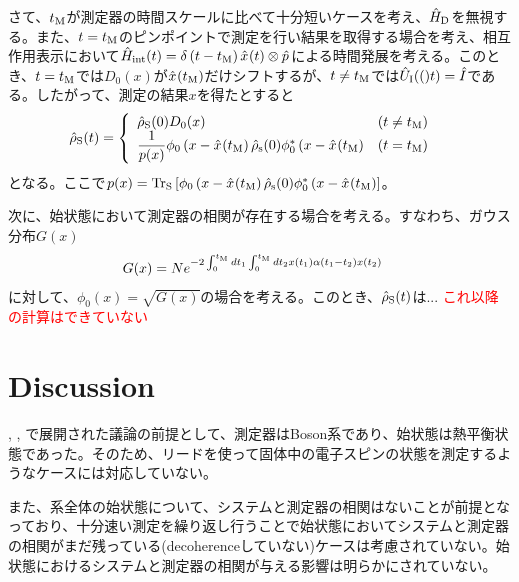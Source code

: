 \documentclass[10pt, a4paper]{jsarticle}
\begin{document}
さて、$t_{\rm M}$が測定器の時間スケールに比べて十分短いケースを考え、$\hat{H}_{\rm D}$を無視する。また、$t = t_{\rm M}$のピンポイントで測定を行い結果を取得する場合を考え、相互作用表示において$\hat{H}_{\rm int}(t) = \delta \left( t - t_{\rm M} \right) \hat{x}_{}(t) \otimes \hat{p}_{}$による時間発展を考える。このとき、$t = t_{\rm M}$では$D_{0}(x)$が$\hat{x}_{}(t_{\rm M})$だけシフトするが、$t \neq t_{\rm M}$では$\hat{U}_{\rm I}(()t) = \hat{I}_{\rm }$である。したがって、測定の結果$x$を得たとすると
\begin{equation}
\begin{split}
\label{eq:230}
	\hat{\rho}_{\rm S}(t) &= \left\{
		\begin{array}{ll}
			\hat{\rho}_{\rm S}(0) D_{0}(x) & (t \neq t_{\rm M}) \\
			\dfrac{1}{p(x)} \phi_{0} \left( x - \hat{x}_{}(t_{\rm M} \right) \hat{\rho}_{\rm s}(0) \phi_{0}^{*} \left( x - \hat{x}_{}(t_{\rm M} \right) & (t = t_{\rm M})
		\end{array}
		\right.
\end{split}
\end{equation}
となる。ここで$p(x) = {\rm Tr}_{\rm S}\left[ \phi_{0} \left( x - \hat{x}_{}(t_{\rm M} \right) \hat{\rho}_{\rm s}(0) \phi_{0}^{*} \left( x - \hat{x}_{}(t_{\rm M} \right) \right]$。

次に、始状態において測定器の相関が存在する場合を考える。すなわち、ガウス分布$G(x)$
\begin{equation}
\begin{split}
\label{eq:231}
	 G(x) &= N e^{- 2 \int_{0}^{t_{\rm M}} dt_{1} \int_{0}^{t_{\rm M}} dt_{2} x(t_{1}) \alpha\left( t_{1} - t_{2} \right) x(t_{2})}
\end{split}
\end{equation}
に対して、$\phi_{0}(x) = \sqrt{G(x)}$の場合を考える。このとき、$\hat{\rho}_{\rm S}(t)$は... \textcolor{red}{これ以降の計算はできていない}

\section{Discussion}
\label{sec:30}

\cite{diosi2008retarted}, \cite{diosi1993master}, \cite{gambetta2002non-markov}で展開された議論の前提として、測定器はBoson系であり、始状態は熱平衡状態であった。そのため、リードを使って固体中の電子スピンの状態を測定するようなケースには対応していない。

また、系全体の始状態について、システムと測定器の相関はないことが前提となっており、十分速い測定を繰り返し行うことで始状態においてシステムと測定器の相関がまだ残っている(decoherenceしていない)ケースは考慮されていない。始状態におけるシステムと測定器の相関が与える影響は明らかにされていない。
\end{document}
